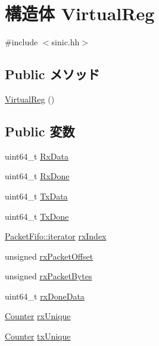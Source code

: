 \hypertarget{structSinic_1_1Device_1_1VirtualReg}{
\section{構造体 VirtualReg}
\label{structSinic_1_1Device_1_1VirtualReg}
}


{\ttfamily \#include $<$sinic.hh$>$}\subsection*{Public メソッド}
\begin{DoxyCompactItemize}
\item 
\hyperlink{structSinic_1_1Device_1_1VirtualReg_a23a91ef4f737638e489fa9a82174e918}{VirtualReg} ()
\end{DoxyCompactItemize}
\subsection*{Public 変数}
\begin{DoxyCompactItemize}
\item 
uint64\_\-t \hyperlink{structSinic_1_1Device_1_1VirtualReg_a6c9104d7b097720d299cae2ffe977554}{RxData}
\item 
uint64\_\-t \hyperlink{structSinic_1_1Device_1_1VirtualReg_a3eeed0cb70c02a0da59c7a4c407dd6e9}{RxDone}
\item 
uint64\_\-t \hyperlink{structSinic_1_1Device_1_1VirtualReg_a6f031a974796558748f14b7ba7f64985}{TxData}
\item 
uint64\_\-t \hyperlink{structSinic_1_1Device_1_1VirtualReg_ab0c6a1c886fdea04c1107ab914188fe7}{TxDone}
\item 
\hyperlink{classPacketFifo_a6905b6d8863a2eecd86b633802b68fda}{PacketFifo::iterator} \hyperlink{structSinic_1_1Device_1_1VirtualReg_ac748495b0282452145381f164d34fafa}{rxIndex}
\item 
unsigned \hyperlink{structSinic_1_1Device_1_1VirtualReg_aade7097b66b9c9fe7f09eb7d6b9b56ee}{rxPacketOffset}
\item 
unsigned \hyperlink{structSinic_1_1Device_1_1VirtualReg_ae77d1e50da368a073a19df07b08d9eca}{rxPacketBytes}
\item 
uint64\_\-t \hyperlink{structSinic_1_1Device_1_1VirtualReg_a820aee0fdf543497af18d8f5ddc3fe7d}{rxDoneData}
\item 
\hyperlink{base_2types_8hh_ae1475755791765b8e6f6a8bb091e273e}{Counter} \hyperlink{structSinic_1_1Device_1_1VirtualReg_a98e0c2747f2107c6f81f51e9ba3bdc8a}{rxUnique}
\item 
\hyperlink{base_2types_8hh_ae1475755791765b8e6f6a8bb091e273e}{Counter} \hyperlink{structSinic_1_1Device_1_1VirtualReg_addcc8e87969e32011941cd144fe23c73}{txUnique}
\end{DoxyCompactItemize}


